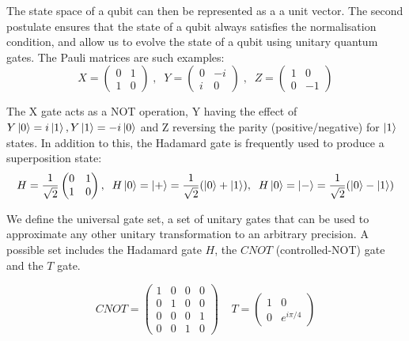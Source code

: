 The state space of a qubit can then be represented as a a unit vector. 
The second postulate ensures that the state of a qubit always satisfies the normalisation condition, and allow us to evolve the state of a qubit using unitary quantum gates. The Pauli matrices are such examples:
\begin{equation}
    X = \begin{pmatrix}
    0 & 1\\ 1 & 0
\end{pmatrix}
\;
, \;\;
Y = \begin{pmatrix}
    0 & -i\\ i & 0
\end{pmatrix}\;
,\;\;
Z = \begin{pmatrix}
    1 & 0\\ 0 & -1
\end{pmatrix}
\end{equation}


The X gate acts as a NOT operation, Y having the effect of $Y\ket{0} = i\ket{1}, Y\ket{1} = -i\ket{0}$ and Z reversing the parity (positive/negative) for $\ket{1}$ states. In addition to this, the Hadamard gate is frequently  used to produce a superposition state:
\begin{equation}
    H =\frac{1}{\sqrt{2}}\begin{pmatrix}
    0 & 1\\ 1 & 0
\end{pmatrix}
,\;\;
H\ket{0} = \ket{+} = \frac{1}{\sqrt{2}}(\ket{0} + \ket{1})
,\;\;
H\ket{0} = \ket{-} = \frac{1}{\sqrt{2}}(\ket{0} - \ket{1})
\end{equation}

We define the universal gate set, a set of unitary gates that can be used to approximate any other unitary transformation to an arbitrary precision. A possible set includes the Hadamard gate $H$, the $CNOT$ (controlled-NOT) gate and the $T$ gate.

\begin{equation}
    CNOT = \begin{pmatrix}
        1 & 0 & 0 & 0 \\
        0 & 1 & 0 & 0 \\
        0 & 0 & 0 & 1 \\
        0 & 0 & 1 & 0
    \end{pmatrix}
    \;\;\;\;
    T = \begin{pmatrix}
        1 & 0 \\ 0 & e^{i\pi/4}
    \end{pmatrix}
\end{equation}


